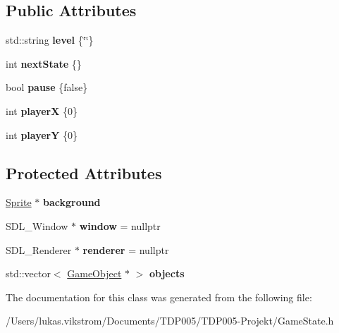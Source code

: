 \subsection*{Public Attributes}
\begin{DoxyCompactItemize}
\item 
\hypertarget{class_game_state_abcdef3f1321523ddec27b9ccbe3787cb}{}std\+::string {\bfseries level} \{\char`\"{}\char`\"{}\}\label{class_game_state_abcdef3f1321523ddec27b9ccbe3787cb}

\item 
\hypertarget{class_game_state_ac03ea6a5b412cd4d2134898453be9049}{}int {\bfseries next\+State} \{\}\label{class_game_state_ac03ea6a5b412cd4d2134898453be9049}

\item 
\hypertarget{class_game_state_a14e5e7cac9f6a8014aa46b457b02f215}{}bool {\bfseries pause} \{false\}\label{class_game_state_a14e5e7cac9f6a8014aa46b457b02f215}

\item 
\hypertarget{class_game_state_a2fbe8294976af31820094bfd26b24f5b}{}int {\bfseries player\+X} \{0\}\label{class_game_state_a2fbe8294976af31820094bfd26b24f5b}

\item 
\hypertarget{class_game_state_a0284357ccdb4a37b613a97a62c44c0ef}{}int {\bfseries player\+Y} \{0\}\label{class_game_state_a0284357ccdb4a37b613a97a62c44c0ef}

\end{DoxyCompactItemize}
\subsection*{Protected Attributes}
\begin{DoxyCompactItemize}
\item 
\hypertarget{class_game_state_a491ae86f9fed2677cb0a3614a9464d11}{}\hyperlink{class_sprite}{Sprite} $\ast$ {\bfseries background}\label{class_game_state_a491ae86f9fed2677cb0a3614a9464d11}

\item 
\hypertarget{class_game_state_afe4de045a38ef13aa48a2c2765eefb12}{}S\+D\+L\+\_\+\+Window $\ast$ {\bfseries window} = nullptr\label{class_game_state_afe4de045a38ef13aa48a2c2765eefb12}

\item 
\hypertarget{class_game_state_a7ed453ab187978a655a8b67c9f4d3672}{}S\+D\+L\+\_\+\+Renderer $\ast$ {\bfseries renderer} = nullptr\label{class_game_state_a7ed453ab187978a655a8b67c9f4d3672}

\item 
\hypertarget{class_game_state_af986003be011f7622bd2b18ba6c2d635}{}std\+::vector$<$ \hyperlink{class_game_object}{Game\+Object} $\ast$ $>$ {\bfseries objects}\label{class_game_state_af986003be011f7622bd2b18ba6c2d635}

\end{DoxyCompactItemize}


The documentation for this class was generated from the following file\+:\begin{DoxyCompactItemize}
\item 
/\+Users/lukas.\+vikstrom/\+Documents/\+T\+D\+P005/\+T\+D\+P005-\/\+Projekt/Game\+State.\+h\end{DoxyCompactItemize}
